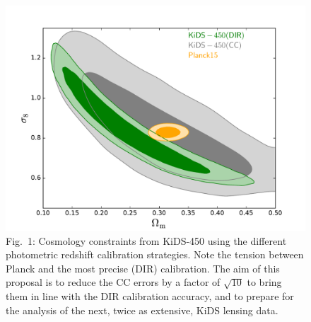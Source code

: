\documentclass{article}[11pt]
\begin{document}
\begin{figure}
 \begin{minipage}[c]{0.6\textwidth}
  \includegraphics[width=\textwidth]{banana_DIR_vs_CC_vs_Planck.pdf}
  \end{minipage}\hfill
  \begin{minipage}[c]{0.35\textwidth}
    \caption*{Fig.~1: Cosmology constraints from KiDS-450 using the different photometric redshift calibration strategies. Note the tension between Planck and the most precise (DIR) calibration. The aim of this proposal is to reduce the CC errors by a factor of $\sqrt{10}$ to bring them in line with the DIR calibration accuracy, and to prepare for the analysis of the next, twice as extensive, KiDS lensing data.}
  \end{minipage}
\end{figure}
\end{document}
